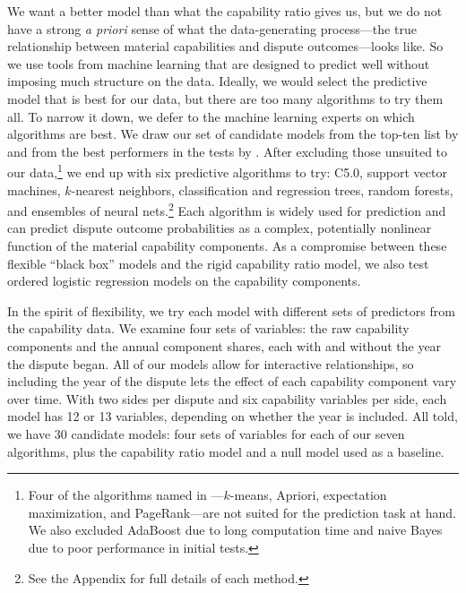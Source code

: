 We want a better model than what the capability ratio gives us, but we do not have a strong \emph{a priori} sense of what the data-generating process---the true relationship between material capabilities and dispute outcomes---looks like.
So we use tools from machine learning that are designed to predict well without imposing much structure on the data.
Ideally, we would select the predictive model that is best for our data, but there are too many algorithms to try them all.
To narrow it down, we defer to the machine learning experts on which algorithms are best.
We draw our set of candidate models from the top-ten list by \citet{Wu:2007ev} and from the best performers in the tests by \citet{FernandezDelgado:2014ul}.
After excluding those unsuited to our data,\footnote{
  Four of the algorithms named in \citet{Wu:2007ev}---$k$-means, Apriori, expectation maximization, and PageRank---are not suited for the prediction task at hand.
  We also excluded AdaBoost due to long computation time and naive Bayes due to poor performance in initial tests.
}
we end up with six predictive algorithms to try: C5.0, support vector machines, $k$-nearest neighbors, classification and regression trees, random forests, and ensembles of neural nets.\footnote{
  See the Appendix for full details of each method.
}
Each algorithm is widely used for prediction and can predict dispute outcome probabilities as a complex, potentially nonlinear function of the material capability components.
As a compromise between these flexible ``black box'' models and the rigid capability ratio model, we also test ordered logistic regression models on the capability components.

In the spirit of flexibility, we try each model with different sets of predictors from the capability data.
We examine four sets of variables: the raw capability components and the annual component shares, each with and without the year the dispute began.
All of our models allow for interactive relationships, so including the year of
the dispute lets the effect of each capability component vary over time.
With two sides per dispute and six capability variables per side, each model has 12 or 13 variables, depending on whether the year is included.
All told, we have 30 candidate models: four sets of variables for each of our seven algorithms, plus the capability ratio model and a null model used as a baseline.

